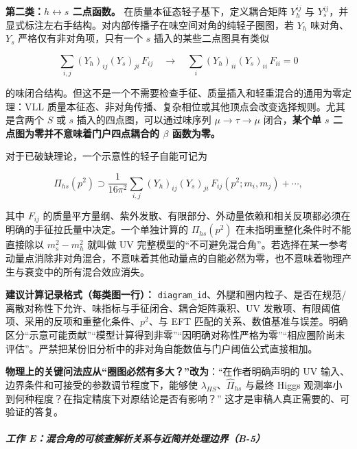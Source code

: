 \documentclass[
]{article}
\begin{document}
\textbf{第二类：\(h\!\leftrightarrow\!s\) 二点函数。}
在质量本征态轻子基下，定义耦合矩阵 \(Y_h^{ij}\) 与
\(Y_s^{ij}\)，并显式标注左右手结构。对内部传播子在味空间对角的纯轻子圈图，若
\(Y_h\) 味对角、\(Y_s\) 严格仅有非对角项，只有一个 \(s\)
插入的某些二点图具有类似

\[
\sum_{i,j}(Y_h)_{ij}(Y_s)_{ji}\,F_{ij}
\quad\longrightarrow\quad
\sum_i (Y_h)_{ii}(Y_s)_{ii}\,F_{ii}=0
\]

的味闭合结构。但这不是一个不需要检查手征、质量插入和轻重混合的通用为零定理：VLL
质量本征态、非对角传播、复杂相位或其他顶点会改变选择规则。尤其是含两个
\(S\) 或 \(s\) 插入的四点图，可以通过味序列 \(\mu\to\tau\to\mu\)
闭合，\textbf{某个单 \(s\) 二点图为零并不意味着门户四点耦合的 \(\beta\)
函数为零。}

对于已破缺理论，一个示意性的轻子自能可记为

\[
\Pi_{hs}(p^2)\supset
\frac{1}{16\pi^2}
\sum_{i,j}(Y_h)_{ij}(Y_s)_{ji}\,
F_{ij}(p^2;m_i,m_j)+\cdots,
\]

其中 \(F_{ij}\)
的质量平方量纲、紫外发散、有限部分、外动量依赖和相关反项都必须在明确的手征拉氏量中决定。一个单独计算的
\(\Pi_{hs}(p^2)\) 在未指明重整化条件时不能直接除以 \(m_s^2-m_h^2\)
就叫做 UV
完整模型的``不可避免混合角''。若选择在某一参考动量点消除非对角混合，不意味着其他动量点的自能必然为零，也不意味着物理产生与衰变中的所有混合效应消失。

\textbf{建议计算记录格式（每类图一行）：}
\texttt{diagram\_id}、外腿和圈内粒子、是否在规范/离散对称性下允许、味指标与手征闭合、耦合矩阵乘积、UV
发散项、有限阈值项、采用的反项和重整化条件、\(p^2\)、与 EFT
匹配的关系、数值基准与误差。明确区分``示意可能贡献''``模型计算得到非零''``因明确对称性严格为零''``相应圈阶尚未评估''。严禁把某份旧分析中的非对角自能数值与门户阈值公式直接相加。

\textbf{物理上的关键问法应从``圈图必然有多大？''改为}：``在作者明确声明的
UV 输入、边界条件和可接受的参数调节程度下，能够使
\(\lambda_{HS}\)、\(\widehat\Pi_{hs}\) 与最终 Higgs
观测率小到何种程度？在指定精度下对原结论是否有影响？''
这才是审稿人真正需要的、可验证的答复。

\subparagraph{工作
E：混合角的可核查解析关系与近简并处理边界（B-5）}\label{ux5de5ux4f5c-eux6df7ux5408ux89d2ux7684ux53efux6838ux67e5ux89e3ux6790ux5173ux7cfbux4e0eux8fd1ux7b80ux5e76ux5904ux7406ux8fb9ux754cb-5}
\end{document}
